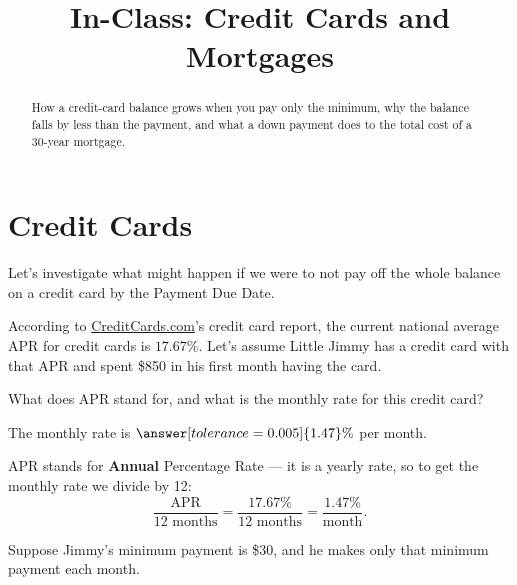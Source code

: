 \documentclass[12pt]{ximera}
\title{In-Class: Credit Cards and Mortgages}
\begin{document}
\begin{abstract}
How a credit-card balance grows when you pay only the minimum, why the balance falls
by less than the payment, and what a down payment does to the total cost of a
30-year mortgage.
\end{abstract}
\maketitle

\section*{Credit Cards}

Let's investigate what might happen if we were to not pay off the whole balance on a
credit card by the Payment Due Date.

According to \href{http://CreditCards.com}{CreditCards.com}'s credit card report, the
current national average APR for credit cards is $17.67\%$. Let's assume Little Jimmy
has a credit card with that APR and spent \$850 in his first month having the card.

\begin{problem}
What does APR stand for, and what is the monthly rate for this credit card?

The monthly rate is $\answer[tolerance=0.005]{1.47}\%$ per month.

\begin{solution}
APR stands for \textbf{Annual} Percentage Rate --- it is a yearly rate, so to get the
monthly rate we divide by 12:
\[
\frac{\text{APR}}{12 \text{ months}} = \frac{17.67\%}{12 \text{ months}}
= \frac{1.47\%}{\text{month}}.
\]
\end{solution}
\end{problem}

Suppose Jimmy's minimum payment is \$30, and he makes only that minimum payment each
month.
\end{document}
